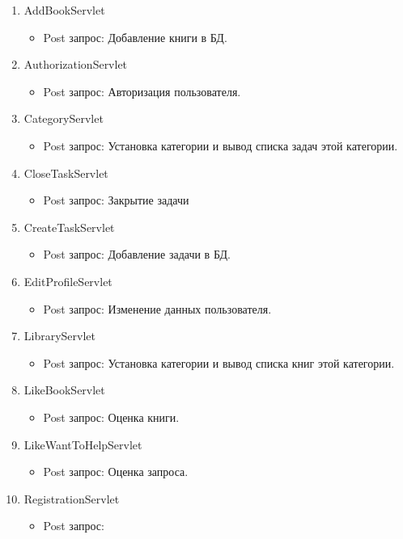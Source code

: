 \begin{enumerate}
\item AddBookServlet
	\begin{itemize} 
	\item Post запрос:	
	Добавление книги в БД.
	\end{itemize}
\item AuthorizationServlet
	\begin{itemize} 
	\item Post запрос:
	Авторизация пользователя.
	\end{itemize}
\item CategoryServlet
	\begin{itemize} 
	\item Post запрос:
	Установка категории и вывод списка задач этой категории.
	\end{itemize}
\item CloseTaskServlet
	\begin{itemize} 
	\item Post запрос:
	Закрытие задачи
	\end{itemize}
\item CreateTaskServlet
	\begin{itemize} 
	\item Post запрос:
	Добавление задачи в БД.
	\end{itemize}
\item EditProfileServlet
	\begin{itemize} 
	\item Post запрос:
	Изменение данных пользователя.
	\end{itemize}
\item LibraryServlet
	\begin{itemize} 
	\item Post запрос:
	Установка категории и вывод списка книг этой категории.
	\end{itemize}
\item LikeBookServlet
	\begin{itemize} 
	\item Post запрос:
	Оценка книги.
	\end{itemize}
\item LikeWantToHelpServlet
	\begin{itemize} 
	\item Post запрос:
	Оценка запроса.
	\end{itemize}
\item RegistrationServlet
	\begin{itemize} 
	\item Post запрос:

\end{itemize}
\end{enumerate}
